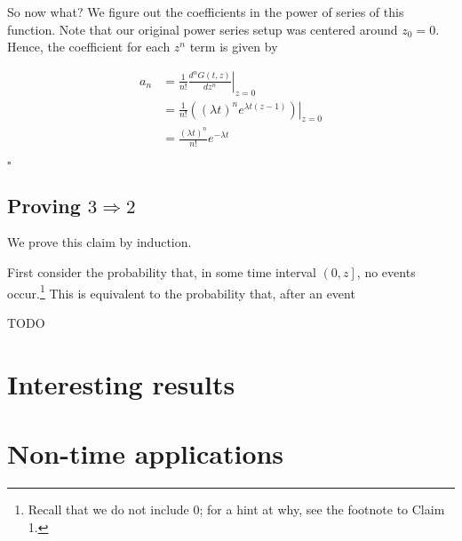 \documentclass{article}
\begin{document}
So now what? We figure out the coefficients in the power of series of this function. Note that our original power series setup was centered around $z_0 = 0$. Hence, the coefficient for each $z^n$ term is given by

\begin{align*}
a_n &= \left.\frac{1}{n!} \frac{d^n G(t, z)}{dz^n}\right\vert_{z=0} \\
&= \left.\frac{1}{n!} \left((\lambda t)^n e^{\lambda t (z-1)}\right) \right\vert_{z=0} \\
&= \frac{(\lambda t)^n}{n!}e^{-\lambda t}
\end{align*}

$\square$


\subsection{Proving $3 \Rightarrow 2$}

We prove this claim by induction. 

First consider the probability that, in some time interval $\left(0, z\right]$, no events occur.\footnote{Recall that we do not include 0; for a hint at why, see the footnote to Claim 1.} This is equivalent to the probability that, after an event 

TODO





\section{Interesting results}


\section{Non-time applications}
\end{document}

